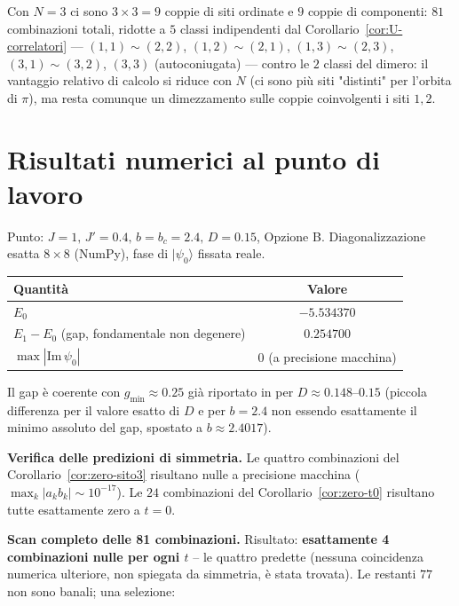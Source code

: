 \documentclass[11pt,a4paper]{article}
\newcommand{\ket}[1]{\lvert #1 \rangle}
\begin{document}
Con $N=3$ ci sono $3\times3=9$ coppie di siti ordinate e $9$ coppie di componenti: $81$
combinazioni totali, ridotte a $5$ classi indipendenti dal Corollario~\ref{cor:U-correlatori}
--- $(1,1)\!\sim\!(2,2)$, $(1,2)\!\sim\!(2,1)$, $(1,3)\!\sim\!(2,3)$, $(3,1)\!\sim\!(3,2)$,
$(3,3)$ (autoconiugata) --- contro le $2$ classi del dimero: il vantaggio relativo di calcolo si
riduce con $N$ (ci sono più siti "distinti" per l'orbita di $\pi$), ma resta comunque un
dimezzamento sulle coppie coinvolgenti i siti $1,2$.

\section{Risultati numerici al punto di lavoro}
\label{sec:numerico}

Punto: $J=1,\,J'=0.4,\,b=b_c=2.4,\,D=0.15$, Opzione B. Diagonalizzazione esatta $8\times8$
(NumPy), fase di $\ket{\psi_0}$ fissata reale.

\begin{center}
\renewcommand{\arraystretch}{1.2}
\begin{tabular}{@{}lc@{}}
\toprule
Quantità & Valore \\
\midrule
$E_0$ & $-5.534370$ \\
$E_1-E_0$ (gap, fondamentale non degenere) & $0.254700$ \\
$\max|\mathrm{Im}\,\psi_0|$ & $0$ (a precisione macchina) \\
\bottomrule
\end{tabular}
\end{center}

Il gap è coerente con $g_{\min}\approx0.25$ già riportato in
\texttt{} per $D\approx0.148$--$0.15$ (piccola
differenza per il valore esatto di $D$ e per $b=2.4$ non essendo esattamente il minimo assoluto
del gap, spostato a $b\approx2.4017$).

\textbf{Verifica delle predizioni di simmetria.} Le quattro combinazioni del
Corollario~\ref{cor:zero-sito3} risultano nulle a precisione macchina
($\max_k|a_kb_k|\sim10^{-17}$). Le $24$ combinazioni del Corollario~\ref{cor:zero-t0} risultano
tutte esattamente zero a $t=0$.

\textbf{Scan completo delle 81 combinazioni.} Risultato: \textbf{esattamente 4 combinazioni
nulle per ogni $t$} -- le quattro predette (nessuna coincidenza numerica ulteriore, non spiegata
da simmetria, è stata trovata). Le restanti $77$ non sono banali; una selezione:
\end{document}
